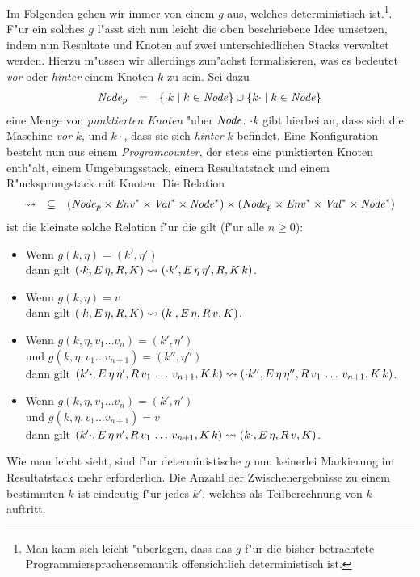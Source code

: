 \documentclass[12pt,a4paper]{article}
\begin{document}
Im Folgenden gehen wir immer von einem $g$ aus, welches deterministisch ist.\footnote{Man kann sich leicht
"uberlegen, dass das $g$ f"ur die bisher betrachtete Programmiersprachensemantik offensichtlich deterministisch
ist.}. F"ur ein solches $g$ l"asst sich nun leicht die oben beschriebene Idee umsetzen, indem nun Resultate und
Knoten auf zwei unterschiedlichen Stacks verwaltet werden. Hierzu m"ussen wir allerdings zun"achst formalisieren,
was es bedeutet \emph{vor} oder \emph{hinter} einem Knoten $k$ zu sein. Sei dazu
\[\begin{array}{rcl}
  \mathit{Node}_p &=& \{\cdot k \mid k \in \mathit{Node}\} \cup \{k \cdot \mid k \in \mathit{Node}\}
\end{array}\]
eine Menge von \emph{punktierten Knoten} "uber $\mathit{Node}$. $\cdot k$ gibt hierbei an, dass sich die Maschine
\emph{vor} $k$, und $k \cdot$, dass sie sich \emph{hinter} $k$ befindet. Eine Konfiguration besteht nun
aus einem \emph{Programcounter}, der stets eine punktierten Knoten enth"alt, einem Umgebungsstack,
einem Resultatstack und einem R"ucksprungstack mit Knoten. Die Relation
\[\begin{array}{rcl}
  \rightsquigarrow &\subseteq& (\mathit{Node}_p \times \mathit{Env}^* \times \mathit{Val}^* \times \mathit{Node}^*) \times (\mathit{Node}_p \times \mathit{Env}^* \times \mathit{Val}^* \times \mathit{Node}^*)
\end{array}\]
ist die kleinste solche Relation f"ur die gilt (f"ur alle $n \ge 0$):
\begin{itemize}
\item Wenn $g(k,\eta) = (k',\eta')$ \\
  dann gilt $(\cdot k,E\,\eta,R,K) \rightsquigarrow (\cdot k',E\,\eta\,\eta',R,K\,k)$.
\item Wenn $g(k,\eta) = v$ \\
  dann gilt $(\cdot k,E\,\eta,R,K) \rightsquigarrow (k\cdot,E\,\eta,R\,v,K)$.
\item Wenn $g(k,\eta,v_1 \ldots v_n) = (k',\eta')$ \\
  und $g(k,\eta,v_1 \ldots v_{n+1}) = (k'',\eta'')$ \\
  dann gilt $(k'\cdot,E\,\eta\,\eta',R\,v_1\,\ldots\,v_{n+1},K\,k) \rightsquigarrow (\cdot k'',E\,\eta\,\eta'',R\,v_1\,\ldots\,v_{n+1},K\,k)$.
\item Wenn $g(k,\eta,v_1 \ldots v_n) = (k',\eta')$ \\
  und $g(k,\eta,v_1 \ldots v_{n+1}) = v$ \\
  dann gilt $(k'\cdot,E\,\eta\,\eta',R\,v_1\,\ldots\,v_{n+1},K\,k) \rightsquigarrow (k\cdot,E\,\eta,R\,v,K)$.
\end{itemize}
Wie man leicht sieht, sind f"ur deterministische $g$ nun keinerlei Markierung im Resultatstack mehr erforderlich.
Die Anzahl der Zwischenergebnisse zu einem bestimmten $k$ ist eindeutig f"ur jedes $k'$, welches als Teilberechnung
von $k$ auftritt.
\end{document}
